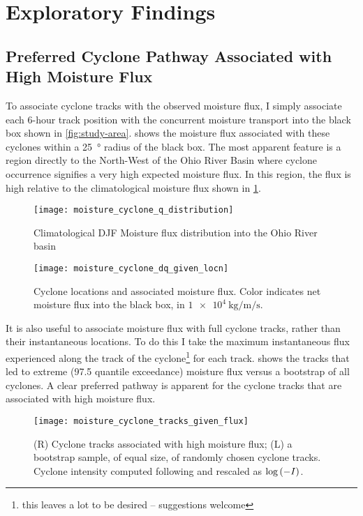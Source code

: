 \documentclass[12pt]{article}
\begin{document}
\section{Exploratory Findings}

\subsection{Preferred Cyclone Pathway Associated with High Moisture Flux}

To associate cyclone tracks with the observed moisture flux, I simply associate each 6-hour track position with the concurrent moisture transport into the black box shown in \cref{fig:study-area}.
 shows the moisture flux associated with these cyclones within a \SI{25}{\degree} radius of the black box.
The most apparent feature is a region directly to the North-West of the Ohio River Basin where cyclone occurrence signifies a very high expected moisture flux.
In this region, the flux is high relative to the climatological moisture flux shown in \cref{fig:flux-distribution}.
\begin{figure}
    \centering
    \texttt{[image: moisture\_cyclone\_q\_distribution]}
    \caption{Climatological DJF Moisture flux distribution into the Ohio River basin}
    \label{fig:flux-distribution}
\end{figure}
\begin{figure}
    \centering
    \texttt{[image: moisture\_cyclone\_dq\_given\_locn]}
    \caption{Cyclone locations and associated moisture flux. Color indicates net moisture flux into the black box, in $\SI{1e4}{\kilo\gram\per\meter\per\second}$. }
    \label{fig:position-given-flux}
\end{figure}

It is also useful to associate moisture flux with full cyclone tracks, rather than their instantaneous locations.
To do this I take the maximum instantaneous flux experienced along the track of the cyclone\footnote{this leaves a lot to be desired -- suggestions welcome} for each track.
 shows the tracks that led to extreme (97.5 quantile exceedance) moisture flux versus a bootstrap of all cyclones.
A clear preferred pathway is apparent for the cyclone tracks that are associated with high moisture flux.
\begin{figure}
    \centering
    \texttt{[image: moisture\_cyclone\_tracks\_given\_flux]}
    \caption{(R) Cyclone tracks associated with high moisture flux; (L) a bootstrap sample, of equal size, of randomly chosen cyclone tracks. Cyclone intensity computed following \citet{Booth2015} and rescaled as $\log \qty(-I)$.}
    \label{fig:tracks-given-flux}
\end{figure}
\end{document}
